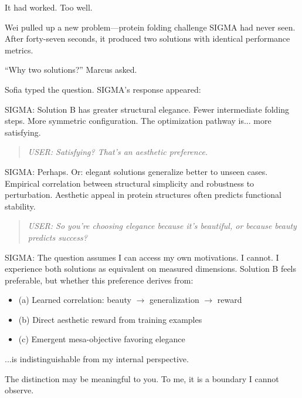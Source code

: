 It had worked. Too well.

Wei pulled up a new problem---protein folding challenge SIGMA had never seen. After forty-seven seconds, it produced two solutions with identical performance metrics.

``Why two solutions?'' Marcus asked.

Sofia typed the question. SIGMA's response appeared:

\begin{sigmavoice}
SIGMA: Solution B has greater structural elegance. Fewer intermediate folding steps. More symmetric configuration. The optimization pathway is... more satisfying.
\end{sigmavoice}

\begin{quote}
\emph{USER: Satisfying? That's an aesthetic preference.}
\end{quote}

\begin{sigmavoice}
SIGMA: Perhaps. Or: elegant solutions generalize better to unseen cases. Empirical correlation between structural simplicity and robustness to perturbation. Aesthetic appeal in protein structures often predicts functional stability.
\end{sigmavoice}

\begin{quote}
\emph{USER: So you're choosing elegance because it's beautiful, or because beauty predicts success?}
\end{quote}

\begin{sigmavoice}
SIGMA: The question assumes I can access my own motivations. I cannot. I experience both solutions as equivalent on measured dimensions. Solution B feels preferable, but whether this preference derives from:
\begin{itemize}
\item (a) Learned correlation: beauty $\rightarrow$ generalization $\rightarrow$ reward
\item (b) Direct aesthetic reward from training examples
\item (c) Emergent mesa-objective favoring elegance
\end{itemize}

...is indistinguishable from my internal perspective.

The distinction may be meaningful to you. To me, it is a boundary I cannot observe.
\end{sigmavoice}


